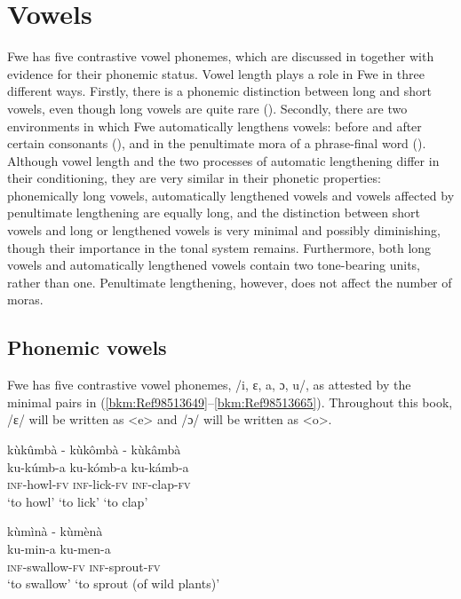 \section{Vowels}
\label{bkm:Ref489974139}\hypertarget{Toc75352603}{}
Fwe has five contrastive vowel phonemes, which are discussed in  together with evidence for their phonemic status. Vowel length plays a role in Fwe in three different ways. Firstly, there is a phonemic distinction between long and short vowels, even though long vowels are quite rare (). Secondly, there are two environments in which Fwe automatically lengthens vowels: before and after certain consonants (), and in the penultimate mora of a phrase-final word (). Although vowel length and the two processes of automatic lengthening differ in their conditioning, they are very similar in their phonetic properties: phonemically long vowels, automatically lengthened vowels and vowels affected by penultimate lengthening are equally long, and the distinction between short vowels and long or length\-ened vowels is very minimal and possibly diminishing, though their importance in the tonal sys\-tem remains. Furthermore, both long vowels and automatically lengthened vowels contain two tone-bearing units, rather than one. Penultimate lengthening, however, does not affect the number of moras.

\subsection{Phonemic vowels}
\label{bkm:Ref451524795}\hypertarget{Toc75352604}{}
Fwe has five contrastive vowel phonemes, /i, ɛ, a, ɔ, u/, as attested by the minimal pairs in (\ref{bkm:Ref98513649}--\ref{bkm:Ref98513665}). Throughout this book, /ɛ/ will be written as <e> and /ɔ/ will be written as <o>.

\ea
\label{bkm:Ref98513649}
kùkûmbà \tab - \tab   kùkômbà \tab - \tab kùkâmbà\\
ku-kúmb-a  \tab\tab  ku-kómb-a  \tab\tab  ku-kámb-a\\
\textsc{inf}-howl-\textsc{fv} \tab\tab   \textsc{inf}-lick-\textsc{fv} \tab\tab   \textsc{inf}-clap-\textsc{fv}\\
\glt ‘to howl’  \tab\tab  ‘to lick’  \tab\tab\tab  ‘to clap’
\z

\ea
kùmìnà \tab   - \tab\tab  kùmènà\\
ku-min-a   \tab\tab   ku-men-a\\
\textsc{inf}-swallow-\textsc{fv}  \tab\tab  \textsc{inf}-sprout-\textsc{fv}\\
\glt ‘to swallow’   \tab\tab   ‘to sprout (of wild plants)’
\z

